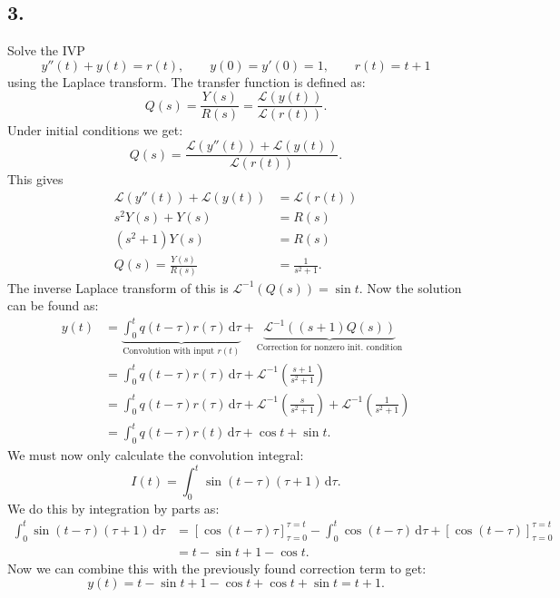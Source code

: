 \subsection*{3.} Solve the IVP
\[ 
y''(t) + y(t) = r(t), \qquad y(0) = y'(0) = 1, \qquad r(t) = t+1
\]
using the Laplace transform.
\bigbreak
The transfer function is defined as:
\[ 
Q(s) = \frac{Y(s)}{R(s)} = \frac{\mathcal{L}\left( y(t) \right) }{\mathcal{L}\left( r(t) \right) }
.\]
Under initial conditions we get:
\[ 
Q(s) = \frac{\mathcal{L}\left( y''(t) \right) + \mathcal{L}\left( y(t) \right) }{\mathcal{L}\left( r(t) \right) }
.\]
This gives
\begin{align*}
  \mathcal{L}\left( y''(t) \right) + \mathcal{L}\left( y(t) \right) &= \mathcal{L}\left( r(t) \right) \\
  s^2 Y(s) + Y(s) &= R(s) \\
  \left( s^2 + 1 \right)Y(s) &= R(s) \\
  Q(s) = \frac{Y(s)}{R(s)} &= \frac{1}{s^2 + 1}
.\end{align*}
The inverse Laplace transform of this is $\mathcal{L}^{-1}\left( Q(s) \right) = \sin t$. Now the solution can be found as:
\begin{align*}
  y(t) &= \underbrace{\int_{0}^{t} q(t-\tau) r(\tau) \, \mathrm{d}\tau}_{\text{Convolution with input } r(t)} + \underbrace{\mathcal{L}^{-1}\left( \left( s+1 \right) Q(s) \right) }_{\text{Correction for nonzero init. condition}} \\
       &= \int_{0}^{t} q(t-\tau) r(\tau) \, \mathrm{d}\tau + \mathcal{L}^{-1}\left( \frac{s+1}{s^2 + 1} \right) \\
       &= \int_{0}^{t} q(t-\tau) r(\tau) \, \mathrm{d}\tau + \mathcal{L}^{-1}\left( \frac{s}{s^2+1} \right) + \mathcal{L}^{-1}\left( \frac{1}{s^2+1} \right)  \\
       &= \int_{0}^{t} q(t-\tau) r (t) \, \mathrm{d}\tau + \cos t + \sin t
.\end{align*}
We must now only calculate the convolution integral:
\[ 
I(t) = \int_{0}^{t} \sin \left( t - \tau \right) \left( \tau + 1 \right) \, \mathrm{d}\tau
.\]
We do this by integration by parts as:
\begin{align*}
  \int_{0}^{t} \sin \left( t - \tau \right) \left( \tau + 1 \right) \, \mathrm{d}\tau &= \left[ \cos \left( t - \tau \right) \tau \right]_{\tau = 0}^{\tau = t} - \int_{0}^{t} \cos \left( t - \tau \right) \, \mathrm{d}\tau + \left[ \cos \left( t - \tau \right)  \right]_{\tau = 0}^{\tau = t} \\
  &= t - \sin t  + 1 - \cos t
.\end{align*}
Now we can combine this with the previously found correction term to get:
\[ 
y(t) = t - \sin t + 1 - \cos t + \cos t + \sin t = t + 1
.\]


